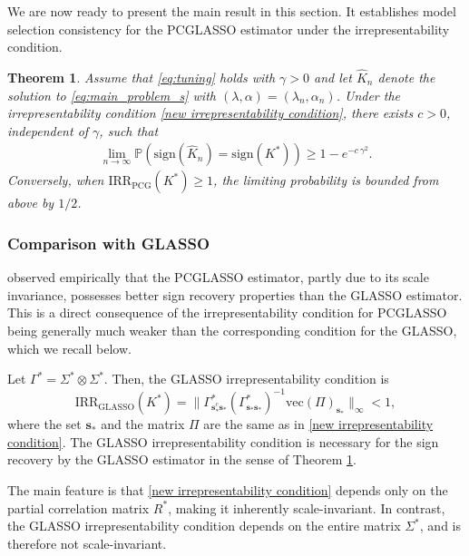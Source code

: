\documentclass[12pt]{amsart}
\numberwithin{equation}{section}
\numberwithin{equation}{section}
\theoremstyle{plain}
\newtheorem{thm}{Theorem}
\theoremstyle{definition}
\newcommand{\sign}{\mathrm{sign}}
\newcommand{\Supp}{\mathbf{s}_\ast}
\begin{document}
We are now ready to present the main result in this section. It establishes model selection consistency for the PCGLASSO estimator under the irrepresentability condition. 

\begin{thm}\label{thm:pattern_recovery} 
Assume that \eqref{eq:tuning} holds with $\gamma>0$ and let $\hat{K}_n$ denote the solution to \eqref{eq:main_problem_s} with $(\lambda,\alpha)=(\lambda_n,\alpha_n)$. Under the irrepresentability condition \eqref{new irrepresentability condition}, there exists $c>0$, independent of $\gamma$, such that
\begin{align*}
     \lim_{n\rightarrow \infty}\mathbb{P}\left(\sign(\hat{K}_n)=\sign(K^\ast)\right)\geq 1-e^{-c\,\gamma^2}.
\end{align*}
Conversely, when $\mathrm{IRR}_{\mathrm{PCG}}(K^\ast)\geq 1$, the limiting probability is bounded from above by $1/2$.
\end{thm}


\subsubsection{Comparison with GLASSO}\label{sec:recoveryGLASSO}

\cite{Carter} observed empirically that the PCGLASSO estimator, partly due to its scale invariance, possesses better sign recovery properties than the GLASSO estimator. This is a direct consequence of the irrepresentability condition for PCGLASSO being generally much weaker than the corresponding condition for the GLASSO, which we recall below. 

Let $\Gamma^\ast = \Sigma^\ast\otimes \Sigma^\ast$. Then, the GLASSO irrepresentability condition is 
\[
 \mathrm{IRR}_{\mathrm{GLASSO}}(K^\ast)= \| \Gamma^\ast_{\Supp^c\Supp} (\Gamma^\ast_{\Supp\Supp})^{-1} \mathrm{vec}(\Pi)_{\Supp} \|_\infty < 1,
\]
where the set $\Supp$ and the matrix $\Pi$ are the same as in \eqref{new irrepresentability condition}. The GLASSO irrepresentability condition is necessary for the sign recovery by the GLASSO estimator in the sense of Theorem \ref{thm:pattern_recovery}.

The main feature is that \eqref{new irrepresentability condition} depends only on the partial correlation matrix
$R^\ast$, making it inherently scale-invariant. In contrast, the GLASSO irrepresentability condition depends on the entire matrix $\Sigma^\ast$, and is therefore not scale-invariant.
\end{document}
